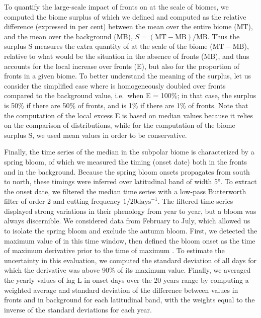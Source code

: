 To quantify the large-scale impact of fronts on  at the scale of biomes, we computed the biome surplus of  which we defined and computed as the relative difference (expressed in per cent) between the mean  over the entire biome (MT), and the mean  over the background (MB), \(S = (\mathrm{MT}-\mathrm{MB}) / \mathrm{MB}\).
Thus the surplus S measures the extra quantity of  at the scale of the biome (\(\mathrm{MT} - \mathrm{MB}\)), relative to what would be the situation in the absence of fronts (MB), and thus accounts for the local increase over fronts (E), but also for the proportion of fronts in a given biome.
To better understand the meaning of the surplus, let us consider the simplified case where  is homogeneously doubled over fronts compared to the background value, i.e.\ when E = 100\%; in that case, the surplus  is 50\% if there are 50\% of fronts, and is 1\% if there are 1\% of fronts.
Note that the computation of the local excess E is based on median values because it relies on the comparison of distributions, while for the computation of the biome surplus S, we used mean values in order to be conservative.

Finally, the time series of the  median in the subpolar biome is characterized by a spring bloom, of which we measured the timing (onset date) both in the fronts and in the background.
Because the spring bloom onsets propagates from south to north, these timings were inferred over latitudinal band of width 5°.
To extract the onset date, we filtered the  median time series with a low-pass Butterworth filter of order 2 and cutting frequency \(1/20 \textrm{days}^{-1}\).
The filtered time-series displayed strong variations in their phenology from year to year, but a bloom was always discernible.
We considered data from February to July, which allowed us to isolate the spring bloom and exclude the autumn bloom.
First, we detected the maximum value of  in this time window, then defined the bloom onset as the time of maximum  derivative prior to the time of maximum .
To estimate the uncertainty in this evaluation, we computed the standard deviation of all days for which the  derivative was above 90\% of its maximum value.
Finally, we averaged the yearly values of lag L in onset days over the 20 years range by computing a weighted average and standard deviation of the difference between values in fronts and in background for each latitudinal band, with the weights equal to the inverse of the standard deviations for each year.

